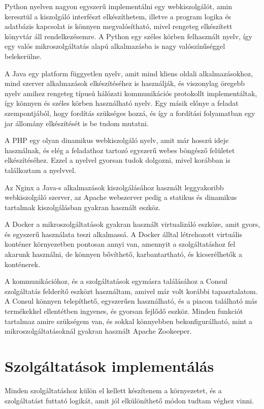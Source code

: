 \documentclass[11pt,magyar,a4paper,twoside,]{report}
\begin{document}
Python nyelven nagyon egyszerű implementálni egy webkiszolgálót, amin
keresztül a kiszolgáló interfészt elkészíthetem, illetve a program
logika és adatbázis kapcsolat is könnyen megvalósítható, mivel rengeteg
elkészített könyvtár áll rendelkezésemre. A Python egy széles körben
felhasznált nyelv, így egy valós mikroszolgáltatás alapú alkalmazásba is
nagy valószínűséggel belekerülne.

A Java egy platform függyetlen nyelv, amit mind kliens oldali
alkalmazásokhoz, mind szerver alkalmazások elkészítéséhez is használják,
és viszonylag öregebb nyelv amihez rengeteg típusú hálózati
kommunikációs protokollt implementáltak, így könnyen és széles körben
használható nyelv. Egy másik előnye a feladat szempontjából, hogy
fordítás szükséges hozzá, és így a fordítási folyamatban egy jar
állomány elkészítését is be tudom mutatni.

A PHP egy olyan dinamikus webkiszolgáló nyelv, amit már hosszú ideje
használnak, és elég a feladathoz tartozó egyszerű webes böngésző
felületet elkészítéséhez. Ezzel a nyelvel gyorsan tudok dolgozni, mivel
korábban is találkoztam a nyelvvel.

Az Nginx a Java-s alkalmazások kiszolgálásához használt leggyakoribb
webkiszolgáló szerver, az Apache webszerver pedig a statikus és
dinamikus tartalmak kiszolgálásban gyakran használt eszköz.

A Docker a mikroszolgáltatások gyakran használt virtualizáló eszköze,
amit gyors, és egyszerű használata teszi alkalmassá. A Docker álltal
létrehozott virtuális konténer környezetben pontosan annyi van, amennyit
a szolgáltatáshoz fel akarunk használni, de könnyen bővíthető,
karbantartható, és kicserélhetők a konténerek.

A kommunikációhoz, és a szolgáltatások egymásra találásához a Consul
szolgáltatás felderítő eszközt használtam, amivel már volt korábbi
tapasztalatom. A Consul könnyen telepíthető, egyszerűen használható, és
a piacon található más termékekkel ellentétben ingyenes, és gyorsan
fejlődő eszköz. Minden funkciót tartalmaz amire szükségem van, és sokkal
könnyebben bekonfigurálható, mint a mikroszolgáltatásoknál gyakran
használt Apache Zookeeper.

\section{Szolgáltatások
implementálás}\label{szolguxe1ltatuxe1sok-implementuxe1luxe1s}

Minden szolgáltatáshoz külön el kellett készítenem a környezetet, és a
szolgáltatást futtató logikát, amit jól elkülöníthető módon tudtam
véghez vinni.
\end{document}
